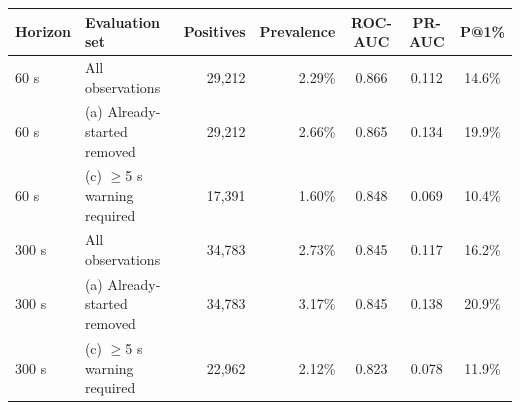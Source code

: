 \begin{tabular}{llrrccc}
\toprule
Horizon & Evaluation set & Positives & Prevalence & ROC-AUC & PR-AUC & P@1\% \\
\midrule
60 s & All observations & 29{,}212 & 2.29\% & 0.866 & 0.112 & 14.6\% \\
60 s & (a) Already-started removed & 29{,}212 & 2.66\% & 0.865 & 0.134 & 19.9\% \\
60 s & (c) $\geq$5 s warning required & 17{,}391 & 1.60\% & 0.848 & 0.069 & 10.4\% \\
300 s & All observations & 34{,}783 & 2.73\% & 0.845 & 0.117 & 16.2\% \\
300 s & (a) Already-started removed & 34{,}783 & 3.17\% & 0.845 & 0.138 & 20.9\% \\
300 s & (c) $\geq$5 s warning required & 22{,}962 & 2.12\% & 0.823 & 0.078 & 11.9\% \\
\bottomrule
\end{tabular}
